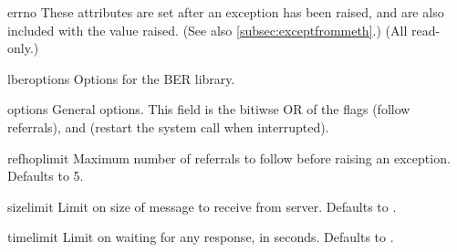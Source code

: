 
\begin{memberdesc}[LDAP]{errno} %
    These attributes are set after an exception has been raised, and
    are also included with the value raised. 
    (See also \ref{subsec:exceptfrommeth}.)
    (All read-only.)
\end{memberdesc}


\begin{memberdesc}[LDAP]{lberoptions} %
    Options for the BER library.
\end{memberdesc}


\begin{memberdesc}[LDAP]{options} %
    General options. This field is the bitiwse OR of the flags
	 (follow referrals), and
	   (restart the  system call
			      when interrupted).
\end{memberdesc}


\begin{memberdesc}[LDAP]{refhoplimit} %
    Maximum number of referrals to follow before raising an exception.
    Defaults to 5.
\end{memberdesc}


\begin{memberdesc}[LDAP]{sizelimit} %
    Limit on size of message to receive from server. 
    Defaults to .
\end{memberdesc}


\begin{memberdesc}[LDAP]{timelimit} %
    Limit on waiting for any response, in seconds. 
    Defaults to .
\end{memberdesc}


